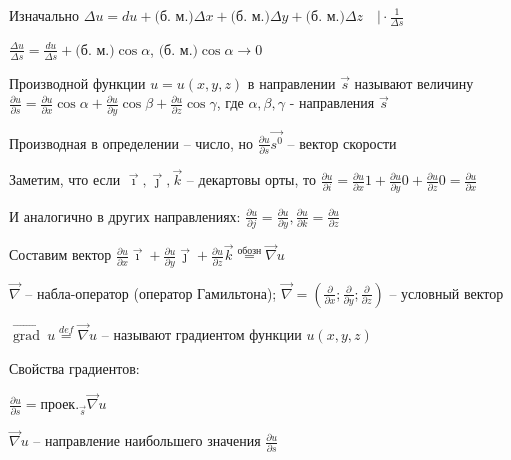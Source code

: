 \documentclass[12pt]{article}
\begin{document}
    \Nota Изначально $\Delta u = du + \text{(б. м.)} \Delta x + \text{(б. м.)} \Delta y + \text{(б. м.)} \Delta z \quad \Big| \cdot \frac{1}{\Delta s}$

    $\frac{\Delta u}{\Delta s} = \frac{du}{\Delta s} + \text{(б. м.)} \cos\alpha$, $\text{(б. м.)} \cos\alpha \rightarrow 0$

    \hypertarget{derivativeoffunctionindirection}{}

    \Def Производной функции $u = u(x, y, z)$ в направлении $\vec{s}$ называют величину $\frac{\partial u}{\partial s} = \frac{\partial u}{\partial x} \cos\alpha + \frac{\partial u}{\partial y} \cos\beta + \frac{\partial u}{\partial z} \cos\gamma$, где $\alpha, \beta, \gamma$ - направления $\vec{s}$

    \Nota Производная в определении -- число, но $\frac{\partial u}{\partial s} \vec{s^0}$ -- вектор скорости

    \Nota Заметим, что если $\vec \imath, \vec \jmath, \vec{k}$ -- декартовы орты, то
    $\frac{\partial u}{\partial i} = \frac{\partial u}{\partial x} 1 + \frac{\partial u}{\partial y} 0 + \frac{\partial u}{\partial z} 0 = \frac{\partial u}{\partial x}$

    И аналогично в других направлениях: $\frac{\partial u}{\partial j} = \frac{\partial u}{\partial y}, \frac{\partial u}{\partial k} = \frac{\partial u}{\partial z}$

    Составим вектор $\frac{\partial u}{\partial x} \vec \imath + \frac{\partial u}{\partial y} \vec \jmath + \frac{\partial u}{\partial z} \vec k \stackrel{\text{обозн}}{=} \vec\nabla u$

    \hypertarget{gradientdefinition}{}

    $\vec\nabla$ -- набла-оператор (оператор Гамильтона); $\vec\nabla = \left(\frac{\partial}{\partial x}; \frac{\partial}{\partial y}; \frac{\partial}{\partial z}\right)$ -- условный вектор

    \Def $\overrightarrow{\operatorname{grad}} \ u \stackrel{def}{=} \vec\nabla u$ -- называют градиентом функции $u(x, y, z)$

    \hypertarget{gradientproperties}{}

    Свойства градиентов:

    \begin{MyTheorem}
         $\frac{\partial u}{\partial s} = \text{проек.}_{\vec{s}} \vec\nabla u$
    \end{MyTheorem}

    \begin{MyTheorem}
         $\vec\nabla u$ -- направление наибольшего значения $\frac{\partial u}{\partial s}$
    \end{MyTheorem}
\end{document}
